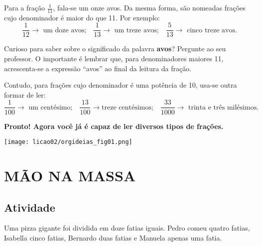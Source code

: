 Para a fração $\frac{1}{11}$, fala-se um onze avos. Da mesma forma, são nomeadas frações cujo denominador é maior do que 11. Por exemplo:
$$\frac{1}{12}\rightarrow \text{  um doze avos;}\quad \frac{1}{13}\rightarrow \text{ um treze avos;} \quad \frac{5}{13}\rightarrow \text{ cinco treze avos.}$$

Curioso para saber sobre o significado da palavra {\bf avos}? Pergunte ao seu professor. O importante é lembrar que, para denominadores maiores 11, acrescenta-se a expressão ``avos'' ao final da leitura da fração.

Contudo, para frações cujo denominador é uma potência de 10, usa-se outra formar de ler:
$$\frac{1}{100}\rightarrow \text{ um centésimo;}\quad \frac{13}{100} \rightarrow \text{treze centésimos;} \quad
\frac{33}{1000}\rightarrow \text{ trinta e três milésimos.}$$

{\bf Pronto! Agora você já é capaz de ler diversos tipos de frações.}

\begin{center}
 \texttt{[image: licao02/orgideias\_fig01.png]}
\end{center}


\section{MÃO NA MASSA }

\subsection{Atividade}

Uma pizza gigante foi dividida em doze fatias iguais.
Pedro comeu quatro fatias, Isabella cinco fatias, Bernardo duas fatias e Manuela apenas uma fatia.

